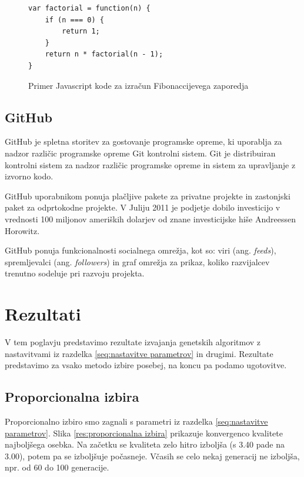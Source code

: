 \documentclass[a4paper, 12pt]{book}
\begin{document}
\begin{figure}
\begin{lstlisting}
var factorial = function(n) {
    if (n === 0) {
        return 1;
    }
    return n * factorial(n - 1);
}
\end{lstlisting}
\caption{Primer Javascript kode za izra\v cun Fibonaccijevega zaporedja}
\label{fig:javascript primer}
\end{figure}

\section{GitHub}
\label{seq:github}
GitHub je spletna storitev za gostovanje programske opreme, ki uporablja za nadzor razli\v cic programske opreme Git kontrolni sistem. Git je distribuiran kontrolni sistem za nadzor razli\v cic programske opreme in sistem za upravljanje z izvorno kodo.

GitHub uporabnikom ponuja pla\v cljive pakete za privatne projekte in zastonjski paket za odprtokodne projekte. V Juliju 2011 je podjetje dobilo investicijo v vrednosti 100 miljonov ameri\v skih dolarjev od znane investicijske hi\v se Andreessen Horowitz.

GitHub ponuja funkcionalnosti socialnega omre\v zja, kot so: viri (ang. \textit{feeds}), spremljevalci (ang. \textit{followers}) in graf omre\v zja za prikaz, koliko razvijalcev trenutno sodeluje pri razvoju projekta.
\cite{wikipedia-github}

\chapter{Rezultati}
\label{ch4}

V tem poglavju predstavimo rezultate izvajanja genetskih algoritmov z nastavitvami iz razdelka \ref{seq:nastavitve parametrov} in drugimi. Rezultate predstavimo za vsako metodo izbire posebej, na koncu pa podamo ugotovitve.

\section{Proporcionalna izbira}
Proporcionalno izbiro smo zagnali s parametri iz razdelka \ref{seq:nastavitve parametrov}. Slika \ref{res:proporcionalna izbira} prikazuje konvergenco kvalitete najbolj\v sega osebka. Na za\v cetku se kvaliteta zelo hitro izbolj\v sa (s 3.40 pade na 3.00), potem pa se izbolj\v suje po\v casneje. V\v casih se celo nekaj generacij ne izbolj\v sa, npr. od 60 do 100 generacije. 
\end{document}
